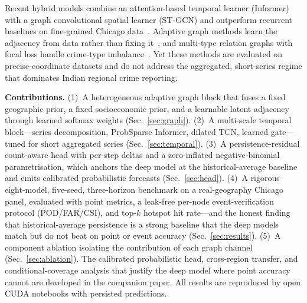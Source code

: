 \documentclass[11pt,conference]{IEEEtran}
\begin{document}
Recent hybrid models combine an attention-based temporal learner (Informer)
with a graph convolutional spatial learner (ST-GCN) and outperform recurrent
baselines on fine-grained Chicago data~\cite{fan2025informer}. Adaptive graph
methods learn the adjacency from data rather than fixing it~\cite{wu2019graphwavenet,
qin2025acsaformer,shan2025adagnclstm}, and multi-type relation graphs with
focal loss handle crime-type imbalance~\cite{wang2025mragnn}. Yet these methods
are evaluated on precise-coordinate datasets and do not address the aggregated,
short-series regime that dominates Indian regional crime reporting.

\textbf{Contributions.} (1)~A heterogeneous adaptive graph block that fuses a
fixed geographic prior, a fixed socioeconomic prior, and a learnable latent
adjacency through learned softmax weights (Sec.~\ref{sec:graph}). (2)~A
multi-scale temporal block---series decomposition, ProbSparse Informer, dilated
TCN, learned gate---tuned for short aggregated series (Sec.~\ref{sec:temporal}).
(3)~A persistence-residual count-aware head with per-step deltas and a
zero-inflated negative-binomial parametrisation, which anchors the deep model
at the historical-average baseline and emits calibrated probabilistic forecasts
(Sec.~\ref{sec:head}). (4)~A rigorous eight-model, five-seed, three-horizon
benchmark on a real-geography Chicago panel, evaluated with point metrics, a
leak-free per-node event-verification protocol (POD/FAR/CSI), and top-$k$
hotspot hit rate---and the honest finding that historical-average persistence
is a strong baseline that the deep models match but do not beat on point or
event accuracy (Sec.~\ref{sec:results}). (5)~A component ablation isolating the
contribution of each graph channel (Sec.~\ref{sec:ablation}). The calibrated
probabilistic head, cross-region transfer, and conditional-coverage analysis
that justify the deep model where point accuracy cannot are developed in the
companion paper. All results are reproduced by open CUDA notebooks with
persisted predictions.

\end{document}
